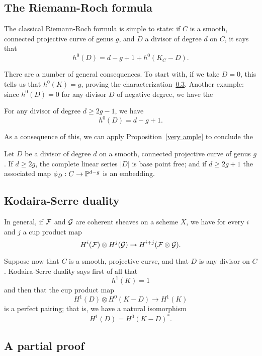 \documentclass[12pt, leqno]{book}
\def\cF{{\cal F}}
\def\cG{{\cal G}}
\begin{document}
\subsection{The Riemann-Roch formula}

The classical Riemann-Roch formula is simple to state: if $C$ is a smooth, connected projective curve of genus $g$, and $D$ a divisor of degree $d$ on $C$, it says that
$$
h^0(D) = d - g + 1 + h^0(K_C - D).
$$

There are a number of general consequences. To start with, if we take $D=0$, this tells us that $h^0(K) = g$, proving the characterization~\ref{}. Another example: since $h^0(D) = 0$ for any divisor $D$ of negative degree, we have the

\begin{corollary}
For any divisor of degree $d \geq 2g-1$, we have
$$
h^0(D) = d - g + 1.
$$
\end{corollary}

As a consequence of this, we can apply Proposition~\ref{very ample} to conclude the

\begin{corollary}
Let $D$ be a divisor of degree $d$ on a smooth, connected projective curve of genus $g$. If $d \geq 2g$, the complete linear series $|D|$ is base point free; and if $d \geq 2g+1$ the associated map $\phi_D : C \to \PP^{d-g}$ is an embedding.
\end{corollary}

\subsection{Kodaira-Serre duality}

In general, if $\cF$ and $\cG$ are coherent sheaves on a scheme $X$, we have for every $i$ and $j$ a cup product map
$$
H^i(\cF) \otimes H^j(\cG) \to H^{i+j}(\cF \otimes \cG).
$$

Suppose now that $C$ is a smooth, projective curve, and that $D$ is any divisor on $C$. Kodaira-Serre duality says first of all that
$$
h^1(K) = 1
$$
and then that the cup product map
$$
H^1(D) \otimes H^0(K-D) \to H^1(K)
$$
is a perfect pairing; that is, we have a natural isomorphism
$$
H^1(D) = H^0(K-D)^*.
$$

\subsection{A partial proof}
\end{document}
